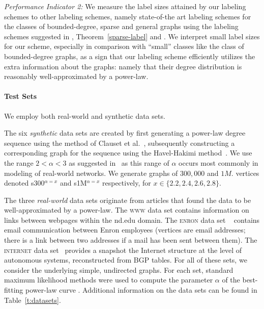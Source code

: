 \emph{Performance Indicator 2:} We  measure the label sizes attained by our labeling schemes to other labeling schemes, namely state-of-the art labeling schemes for the classes of bounded-degree, sparse and general graphs using the  labeling schemes suggested in \cite{adjiashvili2014labeling},  Theorem~\ref{sparse-label} and \cite{alstrup2014adjacency}. We interpret small label sizes for our scheme, especially in comparison with ``small'' classes like the class of bounded-degree graphs, as a sign that our labeling scheme efficiently utilizes the extra information about the graphs: namely that their degree distribution is reasonably well-approximated by a power-law.
 

\paragraph{Test Sets}
We employ both real-world and synthetic data sets. 

The six \emph{synthetic} data sets are created by first generating a power-law degree sequence using the method of Clauset et al.~\cite[App.\ D]{clauset2009power}, subsequently constructing a corresponding graph for the sequence using the Havel-Hakimi method~\cite{hakimi1962realizability}. 
We use the range $2< \alpha < 3$ as suggested in~\cite{clauset2009power} as this range of $\alpha$ occurs most commonly in modeling of real-world networks. We generate graphs of $300,000$ and $1M.$ vertices denoted  s300$^{\alpha=x}$  and s1M$^{\alpha=x}$  respectively, for $x \in \{2.2,2.4,2.6,2.8\}$. 


The three \emph{real-world} data sets originate  from articles that found the data to be well-approximated by a power-law. 
The \textsc{www} data set  \cite{albert1999internet} contains information on links between webpages within the nd.edu domain. 
The \textsc{enron} data set ~\cite{leskovec2009community}  contains email communication between  Enron employees (vertices are email addresses; there is a link between two addresses
if a mail has been sent between them).
The \textsc{internet} data set~\cite{newman} provides a snapshot the Internet structure at the level of  autonomous systems, reconstructed from BGP tables. 
For all of these sets, we consider the underlying simple, undirected graphs. For each set, standard maximum likelihood methods were used to compute the parameter
$\alpha$ of the best-fitting power-law curve \cite{clauset2009power}. Additional information on the data sets can be found in Table~\ref{t:datasets}.

